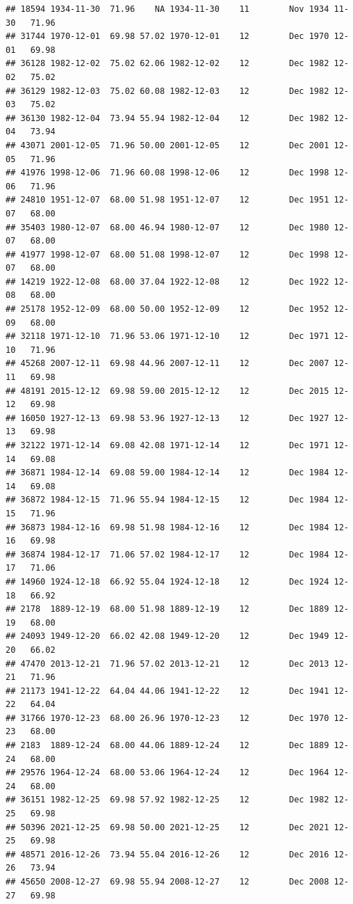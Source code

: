 \documentclass{article}\usepackage[]{graphicx}\usepackage[]{color}
\makeatletter
\newenvironment{kframe}{%
 \def\at@end@of@kframe{}%
 \ifinner\ifhmode%
  \def\at@end@of@kframe{\end{minipage}}%
  \begin{minipage}{\columnwidth}%
 \fi\fi%
 \def\FrameCommand##1{\hskip\@totalleftmargin \hskip-\fboxsep
 \colorbox{shadecolor}{##1}\hskip-\fboxsep
     \hskip-\linewidth \hskip-\@totalleftmargin \hskip\columnwidth}%
 \MakeFramed {\advance\hsize-\width
   \@totalleftmargin\z@ \linewidth\hsize
   \@setminipage}}%
 {\par\unskip\endMakeFramed%
 \at@end@of@kframe}
\newenvironment{knitrout}{}{} %
\makeatother
\begin{document}
\begin{knitrout}
\begin{kframe}
\begin{verbatim}
## 18594 1934-11-30  71.96    NA 1934-11-30    11        Nov 1934 11-30   71.96
## 31744 1970-12-01  69.98 57.02 1970-12-01    12        Dec 1970 12-01   69.98
## 36128 1982-12-02  75.02 62.06 1982-12-02    12        Dec 1982 12-02   75.02
## 36129 1982-12-03  75.02 60.08 1982-12-03    12        Dec 1982 12-03   75.02
## 36130 1982-12-04  73.94 55.94 1982-12-04    12        Dec 1982 12-04   73.94
## 43071 2001-12-05  71.96 50.00 2001-12-05    12        Dec 2001 12-05   71.96
## 41976 1998-12-06  71.96 60.08 1998-12-06    12        Dec 1998 12-06   71.96
## 24810 1951-12-07  68.00 51.98 1951-12-07    12        Dec 1951 12-07   68.00
## 35403 1980-12-07  68.00 46.94 1980-12-07    12        Dec 1980 12-07   68.00
## 41977 1998-12-07  68.00 51.08 1998-12-07    12        Dec 1998 12-07   68.00
## 14219 1922-12-08  68.00 37.04 1922-12-08    12        Dec 1922 12-08   68.00
## 25178 1952-12-09  68.00 50.00 1952-12-09    12        Dec 1952 12-09   68.00
## 32118 1971-12-10  71.96 53.06 1971-12-10    12        Dec 1971 12-10   71.96
## 45268 2007-12-11  69.98 44.96 2007-12-11    12        Dec 2007 12-11   69.98
## 48191 2015-12-12  69.98 59.00 2015-12-12    12        Dec 2015 12-12   69.98
## 16050 1927-12-13  69.98 53.96 1927-12-13    12        Dec 1927 12-13   69.98
## 32122 1971-12-14  69.08 42.08 1971-12-14    12        Dec 1971 12-14   69.08
## 36871 1984-12-14  69.08 59.00 1984-12-14    12        Dec 1984 12-14   69.08
## 36872 1984-12-15  71.96 55.94 1984-12-15    12        Dec 1984 12-15   71.96
## 36873 1984-12-16  69.98 51.98 1984-12-16    12        Dec 1984 12-16   69.98
## 36874 1984-12-17  71.06 57.02 1984-12-17    12        Dec 1984 12-17   71.06
## 14960 1924-12-18  66.92 55.04 1924-12-18    12        Dec 1924 12-18   66.92
## 2178  1889-12-19  68.00 51.98 1889-12-19    12        Dec 1889 12-19   68.00
## 24093 1949-12-20  66.02 42.08 1949-12-20    12        Dec 1949 12-20   66.02
## 47470 2013-12-21  71.96 57.02 2013-12-21    12        Dec 2013 12-21   71.96
## 21173 1941-12-22  64.04 44.06 1941-12-22    12        Dec 1941 12-22   64.04
## 31766 1970-12-23  68.00 26.96 1970-12-23    12        Dec 1970 12-23   68.00
## 2183  1889-12-24  68.00 44.06 1889-12-24    12        Dec 1889 12-24   68.00
## 29576 1964-12-24  68.00 53.06 1964-12-24    12        Dec 1964 12-24   68.00
## 36151 1982-12-25  69.98 57.92 1982-12-25    12        Dec 1982 12-25   69.98
## 50396 2021-12-25  69.98 50.00 2021-12-25    12        Dec 2021 12-25   69.98
## 48571 2016-12-26  73.94 55.04 2016-12-26    12        Dec 2016 12-26   73.94
## 45650 2008-12-27  69.98 55.94 2008-12-27    12        Dec 2008 12-27   69.98

\end{verbatim}
\end{kframe}
\end{knitrout}
\end{document}
